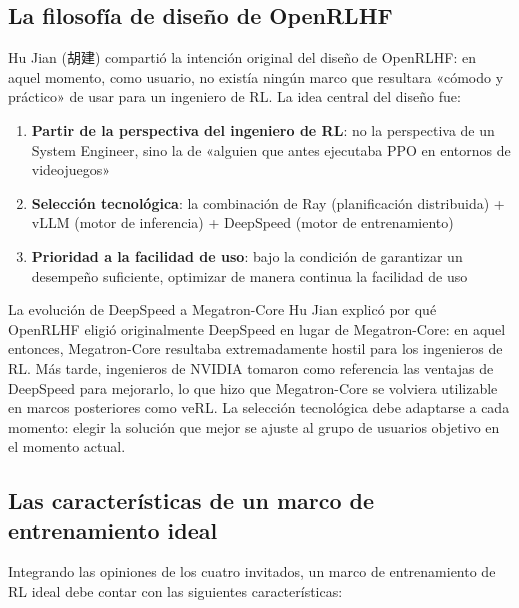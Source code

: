 \documentclass[a4paper]{article}
\begin{document}
\subsection{La filosofía de diseño de OpenRLHF}

Hu Jian (胡建) compartió la intención original del diseño de OpenRLHF: en aquel momento, como usuario, no existía ningún marco que resultara «cómodo y práctico» de usar para un ingeniero de RL. La idea central del diseño fue:

\begin{enumerate}
    \item \textbf{Partir de la perspectiva del ingeniero de RL}: no la perspectiva de un System Engineer, sino la de «alguien que antes ejecutaba PPO en entornos de videojuegos»
    \item \textbf{Selección tecnológica}: la combinación de Ray (planificación distribuida) + vLLM (motor de inferencia) + DeepSpeed (motor de entrenamiento)
    \item \textbf{Prioridad a la facilidad de uso}: bajo la condición de garantizar un desempeño suficiente, optimizar de manera continua la facilidad de uso
\end{enumerate}

\begin{knowledgebox}{La evolución de DeepSpeed a Megatron-Core}
Hu Jian explicó por qué OpenRLHF eligió originalmente DeepSpeed en lugar de Megatron-Core: en aquel entonces, Megatron-Core resultaba extremadamente hostil para los ingenieros de RL. Más tarde, ingenieros de NVIDIA tomaron como referencia las ventajas de DeepSpeed para mejorarlo, lo que hizo que Megatron-Core se volviera utilizable en marcos posteriores como veRL. La selección tecnológica debe adaptarse a cada momento: elegir la solución que mejor se ajuste al grupo de usuarios objetivo en el momento actual.
\end{knowledgebox}

\subsection{Las características de un marco de entrenamiento ideal}

Integrando las opiniones de los cuatro invitados, un marco de entrenamiento de RL ideal debe contar con las siguientes características:
\end{document}
